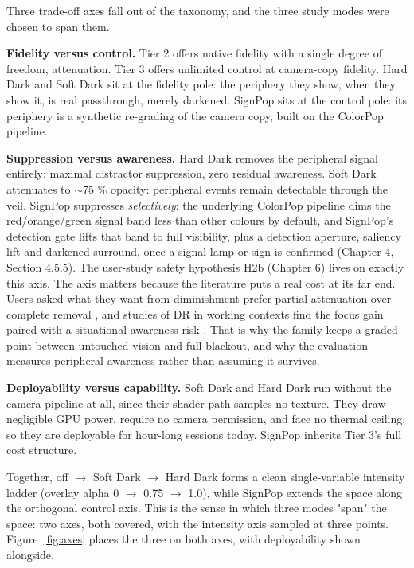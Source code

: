 Three trade-off axes fall out of the taxonomy, and the three study modes were chosen to span them.

\textbf{Fidelity versus control.} Tier 2 offers native fidelity with a single degree of freedom,
attenuation. Tier 3 offers unlimited control at camera-copy fidelity. Hard Dark and Soft Dark sit
at the fidelity pole: the periphery they show, when they show it, is real passthrough, merely
darkened. SignPop sits at the control pole: its periphery is a synthetic re-grading of the camera
copy, built on the ColorPop pipeline.

\textbf{Suppression versus awareness.} Hard Dark removes the peripheral signal entirely: maximal
distractor suppression, zero residual awareness. Soft Dark attenuates to $\sim$75 \% opacity: peripheral
events remain detectable through the veil. SignPop suppresses \textit{selectively}: the underlying ColorPop
pipeline dims the red/orange/green signal band less than other colours by default, and SignPop's
detection gate lifts that band to full visibility, plus a detection aperture, saliency lift and
darkened surround, once a signal lamp or sign is confirmed (Chapter 4, Section 4.5.5). The user-study
safety hypothesis H2b (Chapter 6) lives on exactly this axis. The axis matters because the literature
puts a real cost at its far end. Users asked what they want from diminishment prefer partial
attenuation over complete removal \citep{cheng2022}, and studies of DR in working contexts find
the focus gain paired with a situational-awareness risk \citep{murph2021,mclaughlin2025}. That is why the family keeps a graded point between untouched vision and full blackout, and
why the evaluation measures peripheral awareness rather than assuming it survives.

\textbf{Deployability versus capability.} Soft Dark and Hard Dark run without the camera pipeline at all,
since their shader path samples no texture. They draw negligible GPU power, require no camera
permission, and face no thermal ceiling, so they are deployable for hour-long sessions today. SignPop
inherits Tier 3's full cost structure.

Together, off $\rightarrow$ Soft Dark $\rightarrow$ Hard Dark forms a clean single-variable intensity ladder (overlay alpha
0 $\rightarrow$ 0.75 $\rightarrow$ 1.0), while SignPop extends the space along the orthogonal control axis. This is the
sense in which three modes "span" the space: two axes, both covered, with the intensity axis sampled
at three points. Figure~\ref{fig:axes} places the three on both axes, with deployability shown
alongside.

